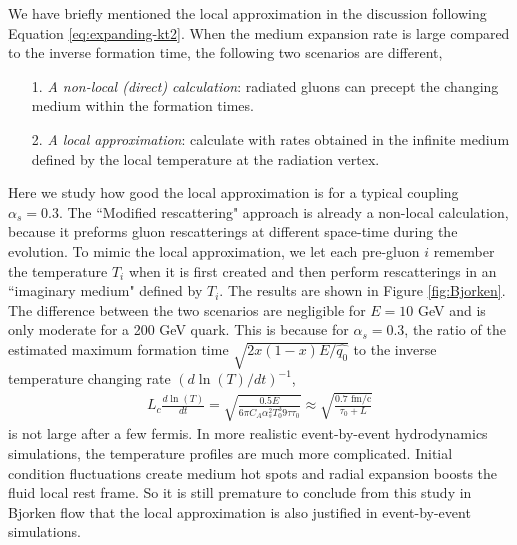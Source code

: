\documentclass[aps, prc, reprint, amsmath, groupedaddress, nofootinbib]{revtex4-1}
\begin{document}
{We have briefly mentioned the local approximation in the discussion following Equation \ref{eq:expanding-kt2}.
When the medium expansion rate is large compared to the inverse formation time, the following two scenarios are different,
\begin{itemize}
\item[1.]  {\it A non-local (direct) calculation}: radiated gluons can precept the changing medium within the formation times.
\item[2.] {\it A local approximation}: calculate with rates obtained in the infinite medium defined by the local temperature at the radiation vertex.
\end{itemize} 
Here we study how good the local approximation is for a typical coupling $\alpha_s = 0.3$.
The ``Modified rescattering" approach is already a non-local calculation, because it preforms gluon rescatterings at different space-time during the evolution. 
To mimic the local approximation, we let each pre-gluon $i$ remember the temperature $T_i$ when it is first created and then perform rescatterings in an ``imaginary medium" defined by $T_i$.
The results are shown in Figure \ref{fig:Bjorken}. 
The difference between the two scenarios are negligible for $E=10$ GeV and is only moderate for a 200 GeV quark.
This is because for $\alpha_s = 0.3$, the ratio of the estimated maximum formation time $\sqrt{2x(1-x)E/\hat{q_0}}$ to the inverse temperature changing rate $(d\ln(T)/dt)^{-1}$,
\begin{eqnarray}
L_c \frac{d\ln(T)}{dt} = \sqrt{\frac{0.5 E}{6\pi C_A\alpha_s^2 T_0^3 9\tau\tau_0}} \approx \sqrt{\frac{0.7 \textrm{ fm/c}}{\tau_0+L}}
\end{eqnarray}
is not large after a few fermis. 
In more realistic event-by-event hydrodynamics simulations, the temperature profiles are much more complicated.
Initial condition fluctuations create medium hot spots and radial expansion boosts the fluid local  rest frame.
So it is still premature to conclude from this study in Bjorken flow that the local approximation is also justified in event-by-event simulations.


}
\end{document}
